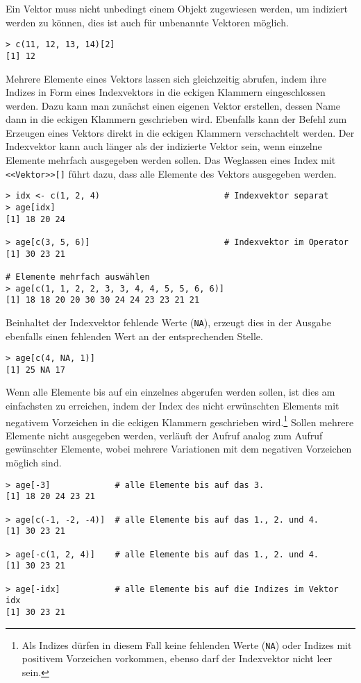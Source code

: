 Ein Vektor muss nicht unbedingt einem Objekt zugewiesen werden, um indiziert werden zu können, dies ist auch für unbenannte Vektoren möglich.
\begin{lstlisting}
> c(11, 12, 13, 14)[2]
[1] 12
\end{lstlisting}

Mehrere Elemente eines Vektors lassen sich gleichzeitig abrufen, indem ihre Indizes in Form eines Indexvektors in die eckigen Klammern eingeschlossen werden. Dazu kann man zunächst einen eigenen Vektor erstellen, dessen Name dann in die eckigen Klammern geschrieben wird. Ebenfalls kann der Befehl zum Erzeugen eines Vektors direkt in die eckigen Klammern verschachtelt werden. Der Indexvektor kann auch länger als der indizierte Vektor sein, wenn einzelne Elemente mehrfach ausgegeben werden sollen. Das Weglassen eines Index mit \lstinline!<<Vektor>>[]! führt dazu, dass alle Elemente des Vektors ausgegeben werden.
\begin{lstlisting}
> idx <- c(1, 2, 4)                         # Indexvektor separat
> age[idx]
[1] 18 20 24

> age[c(3, 5, 6)]                           # Indexvektor im Operator
[1] 30 23 21

# Elemente mehrfach auswählen
> age[c(1, 1, 2, 2, 3, 3, 4, 4, 5, 5, 6, 6)]
[1] 18 18 20 20 30 30 24 24 23 23 21 21
\end{lstlisting}

Beinhaltet der Indexvektor fehlende Werte (\lstinline!NA!), erzeugt dies in der Ausgabe ebenfalls einen fehlenden Wert an der entsprechenden Stelle.
\begin{lstlisting}
> age[c(4, NA, 1)]
[1] 25 NA 17
\end{lstlisting}

Wenn alle Elemente bis auf ein einzelnes abgerufen werden sollen, ist dies am einfachsten zu erreichen, indem der Index des nicht erwünschten Elements mit negativem Vorzeichen in die eckigen Klammern geschrieben wird.\footnote{Als Indizes dürfen in diesem Fall keine fehlenden Werte (\lstinline!NA!) oder Indizes mit positivem Vorzeichen vorkommen, ebenso darf der Indexvektor nicht leer sein.} Sollen mehrere Elemente nicht ausgegeben werden, verläuft der Aufruf analog zum Aufruf gewünschter Elemente, wobei mehrere Variationen mit dem negativen Vorzeichen möglich sind.
\begin{lstlisting}
> age[-3]             # alle Elemente bis auf das 3.
[1] 18 20 24 23 21

> age[c(-1, -2, -4)]  # alle Elemente bis auf das 1., 2. und 4.
[1] 30 23 21

> age[-c(1, 2, 4)]    # alle Elemente bis auf das 1., 2. und 4.
[1] 30 23 21

> age[-idx]           # alle Elemente bis auf die Indizes im Vektor idx
[1] 30 23 21
\end{lstlisting}

